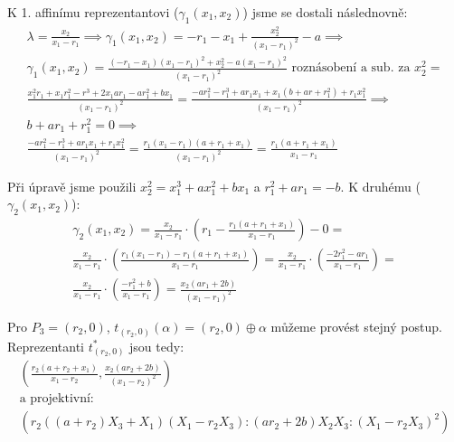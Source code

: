 \documentclass[12pt, a4paper]{article}
\begin{document}
K 1. affinímu reprezentantovi ($\gamma_1(x_1,x_2)$) jsme se dostali následnovně:
\begin{gather*}
\lambda = \frac{x_2}{x_1-r_1} \implies \gamma_1(x_1,x_2) = - r_1 - x_1 + \frac{x_2^2}{(x_1-r_1)^2} - a \implies\\
\gamma_1(x_1,x_2) = \frac{(-r_1-x_1)(x_1-r_1)^2+x_2^2-a(x_1-r_1)^2}{(x_1-r_1)^2} \text{ roznásobení a sub. za $x_2^2$} =\\
\frac{x_1^2r_1+x_1r_1^2-r^3+2x_1ar_1-ar_1^2+bx_1}{(x_1-r_1)^2} = \frac{-ar_1^2-r_1^3+ar_1x_1+x_1(b+ar+r_1^2)+r_1x_1^2}{(x_1-r_1)^2} \implies\\
b+ar_1+r_1^2 = 0 \implies\\
\frac{-ar_1^2-r_1^3+ar_1x_1+r_1x_1^2}{(x_1-r_1)^2} = \frac{r_1(x_1-r_1)(a+r_1+x_1)}{(x_1-r_1)^2} = \frac{r_1(a+r_1+x_1)}{x_1-r_1}
\end{gather*}

Při úpravě jsme použili $x_2^2 = x_1^3+ax_1^2+bx_1$ a $r_1^2+ar_1 = -b$. K druhému ($\gamma_2(x_1,x_2)$):
\begin{gather*}
\gamma_2(x_1,x_2) = \frac{x_2}{x_1-r_1} \cdot \left( r_1 - \frac{r_1(a+r_1+x_1)}{x_1-r_1} \right) - 0 =\\
\frac{x_2}{x_1-r_1} \cdot \left(\frac{r_1(x_1-r_1) - r_1(a+r_1+x_1)}{x_1-r_1} \right) = \frac{x_2}{x_1-r_1} \cdot \left(\frac{-2r_1^2-ar_1}{x_1-r_1} \right) = \\
 \frac{x_2}{x_1-r_1} \cdot \left(\frac{-r_1^2+b}{x_1-r_1} \right) =  \frac{x_2(ar_1+2b)}{(x_1-r_1)^2}
\end{gather*}

Pro $P_3 = (r_2,0)$, $t_{(r_2,0)}(\alpha) = (r_2, 0) \oplus \alpha$ můžeme provést stejný postup. Reprezentanti $t_{(r_2,0)}^*$ jsou tedy:
\begin{gather*}
\left(\frac{r_2(a+r_2+x_1)}{x_1-r_2}, \frac{x_2(ar_2+2b)}{(x_1-r_2)^2} \right )\\
\text{a projektivní:}\\
\left(r_2((a+r_2)X_3 + X_1)(X_1-r_2X_3) : (ar_2+2b)X_2X_3 : (X_1-r_2X_3)^2 \right)
\end{gather*}
\end{document}
